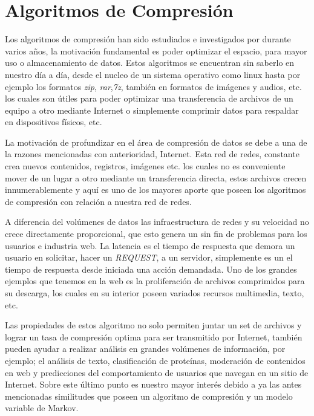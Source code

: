 \chapter[Tema]{Algoritmos de Compresión}
\label{ch:tema}


Los algoritmos de compresión han sido estudiados e investigados por durante varios años, la motivación
fundamental es poder optimizar el espacio, para mayor uso o almacenamiento de datos. Estos algoritmos se encuentran sin saberlo en nuestro día a día, desde el nucleo de un sistema operativo como linux hasta por ejemplo los formatos \emph{zip}, \emph{rar},\emph{7z}, también en formatos de imágenes y audios, etc. los cuales son útiles para poder optimizar una transferencia de archivos de un equipo a otro mediante Internet o simplemente comprimir datos para respaldar en dispositivos físicos, etc.

La motivación de profundizar en el área de compresión de datos se debe a una de la razones mencionadas con anterioridad, Internet. Esta red de redes, constante crea nuevos contenidos, registros, imágenes etc. los cuales no es conveniente mover de un lugar a otro mediante un transferencia directa, estos archivos crecen innumerablemente y aquí es uno de los mayores aporte que poseen los algoritmos de compresión con relación a nuestra red de redes. 

A diferencia del volúmenes de datos las infraestructura de redes y su velocidad no crece directamente proporcional, que esto genera un sin fin de problemas para los usuarios e industria web. La latencia  es el tiempo de respuesta que demora un usuario en solicitar, hacer un \emph{REQUEST}, a un servidor, simplemente es un el tiempo de respuesta desde iniciada una acción demandada. 
Uno de los grandes ejemplos que tenemos en la web es la proliferación de archivos comprimidos para su descarga, los cuales en su interior poseen variados recursos multimedia, texto, etc.

Las propiedades de estos algoritmo no solo permiten juntar un set de archivos y lograr un tasa de compresión optima para ser transmitido por Internet, también pueden ayudar a realizar análisis en grandes volúmenes de información, por ejemplo; el análisis de texto, clasificación de proteínas, moderación de contenidos en web y predicciones del comportamiento de usuarios que navegan en un sitio de Internet. Sobre este último punto es nuestro mayor interés debido a ya las antes mencionadas similitudes que poseen un algoritmo de compresión y un modelo variable de Markov.

